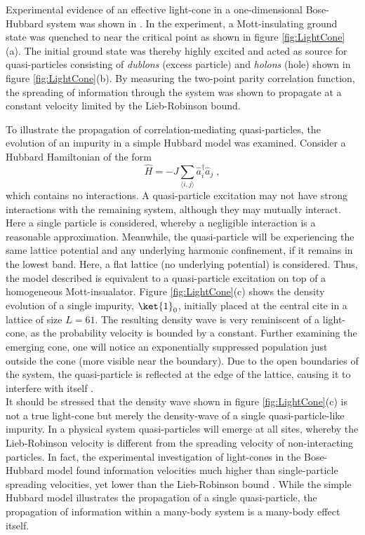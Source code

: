 Experimental evidence of an effective light-cone in a one-dimensional Bose-Hubbard system was shown in \cite{Cheneau2012}. In the experiment, a Mott-insulating ground state was quenched to near the critical point as shown in figure \ref{fig:LightCone}(a). The initial ground state was thereby highly excited and acted as source for quasi-particles consisting of \textit{dublons} (excess particle) and \textit{holons} (hole) shown in figure \ref{fig:LightCone}(b). By measuring the two-point parity correlation function, the spreading of information through the system was shown to propagate at a constant velocity limited by the Lieb-Robinson bound.

To illustrate the propagation of correlation-mediating quasi-particles, the evolution of an impurity in a simple Hubbard model was examined. Consider a Hubbard Hamiltonian of the form
\begin{equation}
	\hat{H} = - J \sum_{\langle i,j \rangle} \hat{a}_{i}^{\dag} \hat{a}_{j} \; ,
	\label{eq:simpleHubbardModel}
\end{equation} 
which contains no interactions. A quasi-particle excitation may not have strong interactions with the remaining system, although they may mutually interact. Here a single particle is considered, whereby a negligible  interaction is a reasonable approximation. Meanwhile, the quasi-particle will be experiencing the same lattice potential and any underlying harmonic confinement, if it remains in the lowest band. Here, a flat lattice (no underlying potential) is considered. Thus, the model described is equivalent to a quasi-particle excitation on top of a homogeneous Mott-insualator.
Figure \ref{fig:LightCone}(c) shows the density evolution of a single impurity, $\ket{1}_{0}$, initially placed at the central cite in a lattice of size $L = 61$. The resulting density wave is very reminiscent of a light-cone, as the probability velocity is bounded by a constant. Further examining the emerging cone, one will notice an exponentially suppressed population just outside the cone (more visible near the boundary). Due to the open boundaries of the system, the quasi-particle is reflected at the edge of the lattice, causing it to interfere with itself \cite{Calabrese2006}.\\
It should be stressed that the density wave shown in figure \ref{fig:LightCone}(c) is not a true light-cone but merely the density-wave of a single quasi-particle-like impurity. In a physical system quasi-particles will emerge at all sites, whereby the Lieb-Robinson velocity is different from the spreading velocity of non-interacting particles. In fact, the experimental investigation of light-cones in the Bose-Hubbard model found information velocities much higher than single-particle spreading velocities, yet lower than the Lieb-Robinson bound \cite{Cheneau2012}. While the simple Hubbard model illustrates the propagation of a single quasi-particle, the propagation of information within a many-body system is a many-body effect itself. \\

